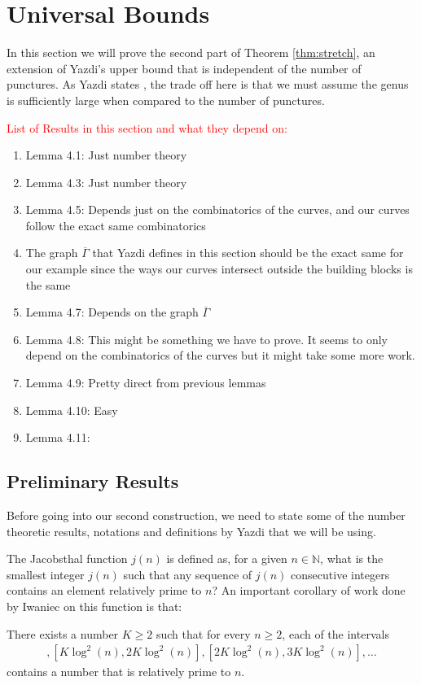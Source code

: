 \section{Universal Bounds}

In this section we will prove the second part of Theorem \ref{thm:stretch}, an extension of Yazdi's upper bound that is independent of the number of punctures. As Yazdi states , the trade off here is that we must assume the genus is sufficiently large when compared to the number of punctures.

\textcolor{red}{List of Results in this section and what they depend on:} 
\begin{enumerate}
    \item Lemma 4.1: Just number theory
    \item Lemma 4.3: Just number theory
    \item Lemma 4.5: Depends just on the combinatorics of the curves, and our curves follow the exact same combinatorics
    \item The graph $\overline{\Gamma}$ that Yazdi defines in this section should be the exact same for our example since the ways our curves intersect outside the building blocks is the same 
    \item Lemma 4.7: Depends on the graph $\overline{\Gamma}$
    \item Lemma 4.8: This might be something we have to prove. It seems to only depend on the combinatorics of the curves but it might take some more work.
    \item Lemma 4.9: Pretty direct from previous lemmas
    \item Lemma 4.10: Easy
    \item Lemma 4.11:
\end{enumerate}

\subsection{Preliminary Results}

Before going into our second construction, we need to state some of the number theoretic results, notations and definitions by Yazdi that we will be using. 

The Jacobsthal function $j(n)$ is defined as, for a given $n \in \mathbb{N}$, what is the smallest integer $j(n)$ such that any sequence of $j(n)$ consecutive integers contains an element relatively prime to $n$? An important corollary of work done by Iwaniec \cite{iwaniec1978problem} on this function is that:
\begin{corollary}
There exists a number $K \geq 2$ such that for every $n \geq 2$, each of the intervals
\begin{align*}
    [\log^2(n),K\log^2(n)], [K\log^2(n),2K\log^2(n)],[2K\log^2(n),3K\log^2(n)],\dots
\end{align*}
contains a number that is relatively prime to $n$.
\end{corollary}

